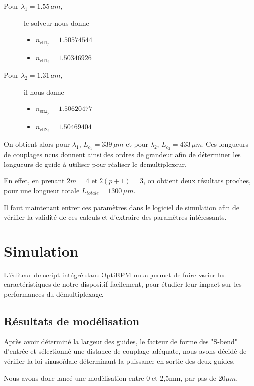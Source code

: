 \documentclass[a4paper,11pt]{report}
\begin{document}
\begin{description}
    \item[Pour $\lambda_1=1.55\,\mu m$,] le solveur nous donne
    \begin{itemize}
        \item $n_{\text{eff}1_p}=1.50574544$
        \item $n_{\text{eff}1_i}=1.50346926$
    \end{itemize}
    \item[Pour $\lambda_2=1.31\,\mu m$,] il nous donne
    \begin{itemize}
        \item $n_{\text{eff}2_p}=1.50620477$
        \item $n_{\text{eff}2_i}=1.50469404$
    \end{itemize}
\end{description}

On obtient alors pour $\lambda_1$, $L_{c_1}=339\,\mu m$ et pour $\lambda_2$, $L_{c_2}=433\,\mu m$. Ces longueurs de couplages nous donnent ainsi des ordres de grandeur afin de déterminer les longueurs de guide à utiliser pour réaliser le demultiplexeur.

En effet, en prenant $2m=4$ et $2(p+1)=3$, on obtient deux résultats proches, pour une longueur totale $L_{totale}=1300\,\mu m$.

Il faut maintenant entrer ces paramètres dans le logiciel de simulation afin de vérifier la validité de ces calculs et d'extraire des paramètres intéressants.
\chapter{Simulation} 

L'éditeur de script intégré dans OptiBPM nous permet de faire varier les caractéristiques de notre dispositif facilement, pour étudier leur impact sur les performances du démultiplexage.


\section{Résultats de modélisation}
Après avoir déterminé la largeur des guides, le facteur de forme des "S-bend" d'entrée et sélectionné une distance de couplage adéquate, nous avons décidé de vérifier la loi sinusoïdale déterminant la puissance en sortie des deux guides.

Nous avons donc lancé une modélisation entre 0 et 2,5mm, par pas de 20$\mu m$.
\end{document}
